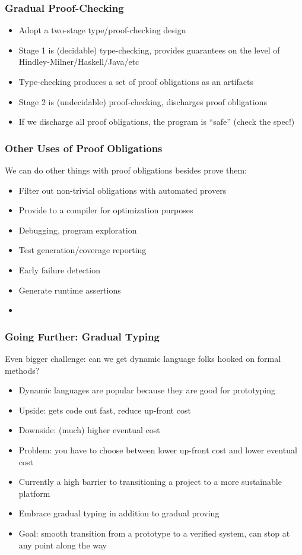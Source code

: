\documentclass{beamer}
\begin{document}
\begin{frame}
  \frametitle{Gradual Proof-Checking}
  \begin{itemize}
    \item Adopt a two-stage type/proof-checking design
    \item Stage 1 is (decidable) type-checking, provides guarantees on
      the level of Hindley-Milner/Haskell/Java/etc
    \item Type-checking produces a set of proof obligations as an artifacts
    \item Stage 2 is (undecidable) proof-checking, discharges proof
      obligations
    \item If we discharge all proof obligations, the program is
      ``safe'' (check the spec!)
  \end{itemize}
\end{frame}

\begin{frame}
  \frametitle{Other Uses of Proof Obligations}

  We can do other things with proof obligations besides prove them:
  \begin{itemize}
    \item Filter out non-trivial obligations with automated provers
    \item Provide to a compiler for optimization purposes
    \item Debugging, program exploration
    \item Test generation/coverage reporting
    \item Early failure detection
    \item Generate runtime assertions
    \item <insert potential thesis topic here>
  \end{itemize}
\end{frame}

\begin{frame}
  \frametitle{Going Further: Gradual Typing}

  Even bigger challenge: can we get dynamic language folks hooked on
  formal methods?
  \begin{itemize}
    \item Dynamic languages are popular because they are good for prototyping
    \item Upside: gets code out fast, reduce up-front cost
    \item Downside: (much) higher eventual cost
    \item Problem: you have to choose between lower up-front cost and
      lower eventual cost
    \item Currently a high barrier to transitioning a project to a
      more sustainable platform
    \item Embrace gradual typing in addition to gradual proving
    \item Goal: smooth transition from a prototype to a verified
      system, can stop at any point along the way
  \end{itemize}
\end{frame}
\end{document}

